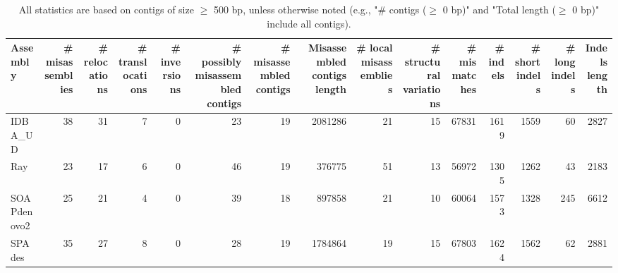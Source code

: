 \documentclass[12pt,a4paper]{article}
\begin{document}
\begin{table}[ht]
\begin{center}
\caption{All statistics are based on contigs of size $\geq$ 500 bp, unless otherwise noted (e.g., "\# contigs ($\geq$ 0 bp)" and "Total length ($\geq$ 0 bp)" include all contigs).}
\begin{tabular}{|l*{14}{|r}|}
\hline
Assembly & \# misassemblies &     \# relocations &     \# translocations &     \# inversions & \# possibly misassembled contigs & \# misassembled contigs & Misassembled contigs length & \# local misassemblies & \# structural variations & \# mismatches & \# indels &     \# short indels &     \# long indels & Indels length \\ \hline
IDBA\_UD & 38 & 31 & 7 & 0 & 23 & 19 & 2081286 & 21 & 15 & 67831 & 1619 & 1559 & 60 & 2827 \\ \hline
Ray & 23 & 17 & 6 & 0 & 46 & 19 & 376775 & 51 & 13 & 56972 & 1305 & 1262 & 43 & 2183 \\ \hline
SOAPdenovo2 & 25 & 21 & 4 & 0 & 39 & 18 & 897858 & 21 & 10 & 60064 & 1573 & 1328 & 245 & 6612 \\ \hline
SPAdes & 35 & 27 & 8 & 0 & 28 & 19 & 1784864 & 19 & 15 & 67803 & 1624 & 1562 & 62 & 2881 \\ \hline
\end{tabular}
\end{center}
\end{table}
\end{document}
